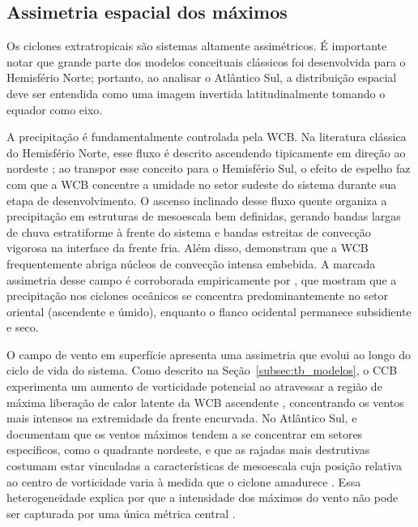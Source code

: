 \subsection{Assimetria espacial dos máximos}\label{subsec:tb_kde_asimetria}

Os ciclones extratropicais são sistemas altamente assimétricos.
É importante notar que grande parte dos modelos conceituais clássicos foi desenvolvida para o Hemisfério Norte; portanto, ao analisar o Atlântico Sul, a distribuição espacial deve ser entendida como uma imagem invertida latitudinalmente tomando o equador como eixo.

A precipitação é fundamentalmente controlada pela WCB.
Na literatura clássica do Hemisfério Norte, esse fluxo é descrito ascendendo tipicamente em direção ao nordeste \citep{blanchard2021warm}; ao transpor esse conceito para o Hemisfério Sul, o efeito de espelho faz com que a WCB concentre a umidade no setor sudeste do sistema durante sua etapa de desenvolvimento.
O ascenso inclinado desse fluxo quente organiza a precipitação em estruturas de mesoescala bem definidas, gerando bandas largas de chuva estratiforme à frente do sistema e bandas estreitas de convecção vigorosa na interface da frente fria.
Além disso, \citet{oertel2021warm} demonstram que a WCB frequentemente abriga núcleos de convecção intensa embebida.
A marcada assimetria desse campo é corroborada empiricamente por \citet{naud2020evaluation}, que mostram que a precipitação nos ciclones oceânicos se concentra predominantemente no setor oriental (ascendente e úmido), enquanto o flanco ocidental permanece subsidiente e seco.

O campo de vento em superfície apresenta uma assimetria que evolui ao longo do ciclo de vida do sistema.
Como descrito na Seção~\ref{subsec:tb_modelos}, o CCB experimenta um aumento de vorticidade potencial ao atravessar a região de máxima liberação de calor latente da WCB ascendente \citep{schemm2014ccb}, concentrando os ventos mais intensos na extremidade da frente encurvada.
No Atlântico Sul, \citet{bitencourt2010relating} e \citet{cardoso2022synoptic} documentam que os ventos máximos tendem a se concentrar em setores específicos, como o quadrante nordeste, e que as rajadas mais destrutivas costumam estar vinculadas a características de mesoescala cuja posição relativa ao centro de vorticidade varia à medida que o ciclone amadurece \citep{eisenstein2023identification}. Essa heterogeneidade explica por que a intensidade dos máximos do vento não pode ser capturada por uma única métrica central \citep{corner2025classification}.

